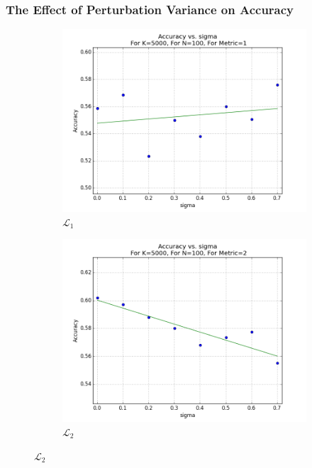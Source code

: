\documentclass{article}
\begin{document}
\subsubsection{The Effect of Perturbation Variance on Accuracy}
\begin{figure}[H]
    \centering
    \begin{subfigure}[h]{.75\textwidth}
    	\includegraphics[width=\textwidth]{experiment1-2-varsigma-1.png}
   	\caption{$\mathcal{L}_1$}
    \end{subfigure}
    \begin{subfigure}[h]{.75\textwidth}
        \includegraphics[width=\textwidth]{experiment1-2-varsigma-2.png}
   	\caption{$\mathcal{L}_2$}
    \end{subfigure}
\end{figure}
\end{document}
